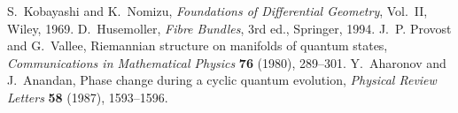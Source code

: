  S.~Kobayashi and K.~Nomizu, \emph{Foundations of Differential Geometry}, Vol.~II, Wiley, 1969.
 D.~Husemoller, \emph{Fibre Bundles}, 3rd ed., Springer, 1994.
 J.~P. Provost and G.~Vallee, Riemannian structure on manifolds of quantum states, \emph{Communications in Mathematical Physics} \textbf{76} (1980), 289--301.
 Y.~Aharonov and J.~Anandan, Phase change during a cyclic quantum evolution, \emph{Physical Review Letters} \textbf{58} (1987), 1593--1596.
